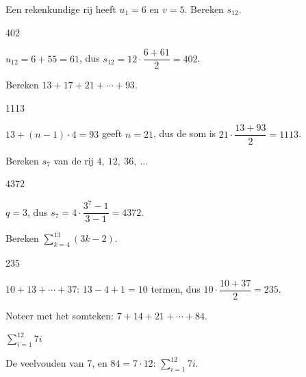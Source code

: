 \begin{oefeningen}
\begin{oefening}[1]\label{oef:h3-t1}
Een rekenkundige rij heeft $u_1 = 6$ en $v = 5$. Bereken $s_{12}$.
\begin{solution}
402
\end{solution}
\begin{fullsolution}
$u_{12}=6+55=61$, dus $s_{12}=12\cdot\dfrac{6+61}{2}=402$.
\end{fullsolution}
\end{oefening}

\begin{oefening}[1]\label{oef:h3-t2}
Bereken $13 + 17 + 21 + \cdots + 93$.
\begin{solution}
1113
\end{solution}
\begin{fullsolution}
$13+(n-1)\cdot 4=93$ geeft $n=21$, dus de som is $21\cdot\dfrac{13+93}{2}=1113$.
\end{fullsolution}
\end{oefening}

\begin{oefening}[1]\label{oef:h3-t3}
Bereken $s_7$ van de rij $4,\ 12,\ 36,\ \ldots$
\begin{solution}
4372
\end{solution}
\begin{fullsolution}
$q=3$, dus $s_7=4\cdot\dfrac{3^7-1}{3-1}=4372$.
\end{fullsolution}
\end{oefening}

\begin{oefening}[2]\label{oef:h3-t4}
Bereken $\displaystyle\sum_{k=4}^{13} (3k - 2)$.
\begin{solution}
235
\end{solution}
\begin{fullsolution}
$10+13+\cdots+37$: $13-4+1=10$ termen, dus $10\cdot\dfrac{10+37}{2}=235$.
\end{fullsolution}
\end{oefening}

\begin{oefening}[1]\label{oef:h3-t5}
Noteer met het somteken: $7 + 14 + 21 + \cdots + 84$.
\begin{solution}
$\displaystyle\sum_{i=1}^{12} 7i$
\end{solution}
\begin{fullsolution}
De veelvouden van 7, en $84=7\cdot 12$: $\displaystyle\sum_{i=1}^{12} 7i$.
\end{fullsolution}
\end{oefening}


\end{oefeningen}
